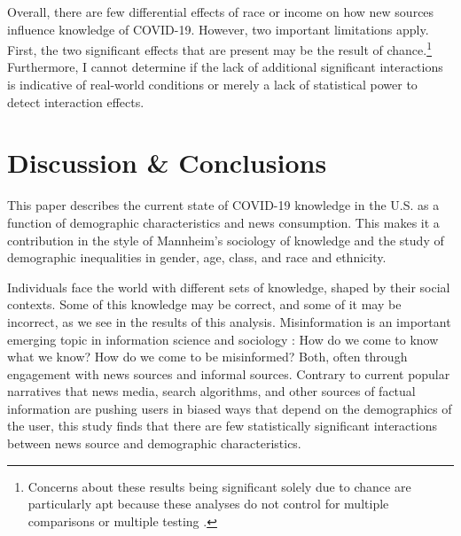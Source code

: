\documentclass[11pt]{article}
\begin{document}

Overall, there are few differential effects of race or income on how new sources influence knowledge of COVID-19. However, two important limitations apply. First, the two significant effects that are present may be the result of chance.\footnote
    {Concerns about these results being significant solely due to chance are particularly apt because these analyses do not control for multiple comparisons or multiple testing \citep{Howell2012}.} 
Furthermore, I cannot determine if the lack of additional significant interactions is indicative of real-world conditions or merely a lack of statistical power to detect interaction effects.


\section{Discussion \& Conclusions}\label{sec:conclusion}

This paper describes the current state of COVID-19 knowledge in the U.S. as a function of demographic characteristics and news consumption. This makes it a contribution in the style of Mannheim's sociology of knowledge \citep{Mannheim1929,Swidler1994} and the study of demographic inequalities in gender, age, class, and race and ethnicity. 

Individuals face the world with different sets of knowledge, shaped by their social contexts. Some of this knowledge may be correct, and some of it may be incorrect, as we see in the results of this analysis. Misinformation is an important emerging topic in information science and sociology \citep{Metaxa-Kakavouli2017}: How do we come to know what we know? How do we come to be misinformed? Both, often through engagement with news sources and informal sources. Contrary to current popular narratives that news media, search algorithms, and other sources of factual information are pushing users in biased ways that depend on the demographics of the user, this study finds that there are few statistically significant interactions between news source and demographic characteristics. 
\end{document}
